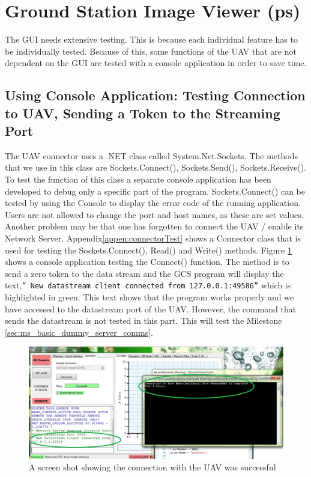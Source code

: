 \section{Ground Station Image Viewer (ps)}
\label{sec:ground_station_image_viewer}
The GUI needs extensive testing. This is because each individual feature has to be individually tested. Because of this, some functions of the UAV that are not dependent on the GUI are tested with a console application in order to save time.
\subsection{Using Console Application: Testing Connection to UAV, Sending a Token to the Streaming Port}
\label{sec:testing_connection_send_to_stream}
The UAV connector uses a .NET class called System.Net.Sockets. The methods that we use in this class are Sockets.Connect(), Sockets.Send(), Sockets.Receive(). To test the function of this class a separate console application has been developed to debug only a specific part of the program. Sockets.Connect() can be tested by using the Console to display the error code of the running application. Users are not allowed to change the port and host names, as these are set values. Another problem may be that one has forgotten to connect the UAV / enable its Network Server. Appendix\ref{appen:connectorTest} shows a Connector class that is used for testing the Sockets.Connect(), Read() and Write() methods.
Figure \ref{connect to Stream Port} shows a console application testing the Connect() function. 
The method is to send a zero token to the data stream and the GCS program will display the text,\texttt{''\* New datastream client connected from 127.0.0.1:49586''} which is highlighted in green. 
This text shows that the program works properly and we have accessed to the datastream port of the UAV.
However, the command that sends the datastream is not tested in this part. 
This will test the Milestone \ref{sec:ms_basic_dummy_server_comms}.
\begin{figure}[H]
\begin{center}
\includegraphics[width=1.00\textwidth]{testing_screenshots/test_sending.png} 
\end{center}
\caption{A screen shot showing the connection with the UAV was successful\label{connect to Stream Port}}
\end{figure}

